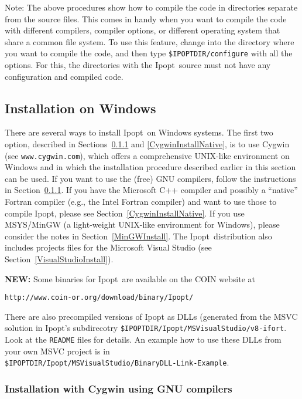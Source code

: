 \documentclass[10pt]{article}
\newcommand{\Ipopt}{{\sc Ipopt}}
\begin{document}
Note: The above procedures show how to compile the code in directories
separate from the source files.  This comes in handy when you want to
compile the code with different compilers, compiler options, or
different operating system that share a common file system.  To use
this feature, change into the directory where you want to compile the
code, and then type {\tt \$IPOPTDIR/configure} with all the options.
For this, the directories with the \Ipopt\ source must not have any
configuration and compiled code.

\subsection{Installation on Windows}\label{WindowsInstall}

There are several ways to install \Ipopt\ on Windows systems.  The
first two option, described in Sections~\ref{CygwinInstall} and
\ref{CygwinInstallNative}, is to use Cygwin (see
\texttt{www.cygwin.com}), which offers a comprehensive UNIX-like
environment on Windows and in which the installation procedure
described earlier in this section can be used.  If you want to use the
(free) GNU compilers, follow the instructions in
Section~\ref{CygwinInstall}.  If you have the Microsoft C++ compiler
and possibly a ``native'' Fortran compiler (e.g., the Intel Fortran
compiler) and want to use those to compile \Ipopt, please see
Section~\ref{CygwinInstallNative}.  If you use MSYS/MinGW (a
light-weight UNIX-like environment for Windows), please consider the
notes in Section~\ref{MinGWInstall}.
%
The \Ipopt\ distribution also includes projects files for the
Microsoft Visual Studio (see Section~\ref{VisualStudioInstall}).

\textbf{NEW:} Some binaries for \Ipopt\ are available on the COIN website at

\texttt{http://www.coin-or.org/download/binary/Ipopt/}

\noindent
There are also precompiled versions of Ipopt as DLLs (generated from
the MSVC solution in \Ipopt's subdirecotry
\texttt{\$IPOPTDIR/Ipopt/MSVisualStudio/v8-ifort}.  Look at the
\texttt{README} files for details.  An example how to use these DLLs
from your own MSVC project is in\\
\texttt{\$IPOPTDIR/Ipopt/MSVisualStudio/BinaryDLL-Link-Example}.


\subsubsection{Installation with Cygwin using GNU compilers}\label{CygwinInstall}
\end{document}
